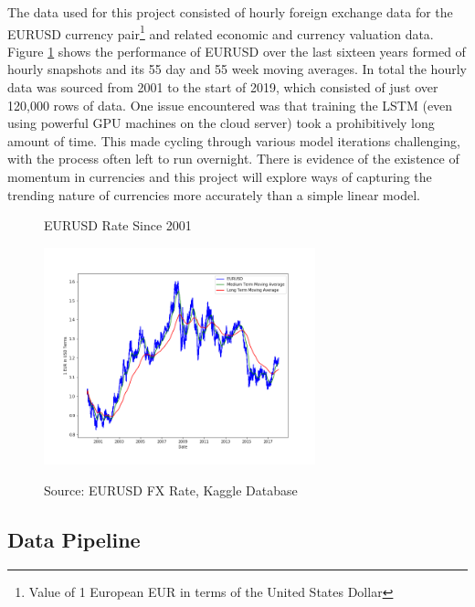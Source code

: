 \documentclass[11pt]{article}
\begin{document}
The data used for this project consisted of hourly foreign exchange data for the EURUSD currency pair\footnote{Value of 1 European EUR in terms of the United States Dollar} and related economic and currency valuation data. Figure \ref{fig:EURUSDMovingAvg} shows the performance of EURUSD over the last sixteen years formed of hourly snapshots and its 55 day and 55 week moving averages. In total the hourly data was sourced from 2001 to the start of 2019, which consisted of just over 120,000 rows of data. One issue encountered was that training the LSTM (even using powerful GPU machines on the cloud server) took a prohibitively long amount of time. This made cycling through various model iterations challenging, with the process often left to run overnight.  There is evidence of the existence of momentum in currencies \cite{Filippou2017} and this project will explore ways of capturing the trending nature of currencies more accurately than a simple linear model.
\begin{figure}[h]
    \centering
	\caption{EURUSD Rate Since 2001}
    \includegraphics[width=0.7\textwidth]{EURUSDMovingAvg}   
    \label{fig:EURUSDMovingAvg}
\caption*{\small Source: EURUSD FX Rate, Kaggle Database}
\end{figure}

\subsection{Data Pipeline}
\end{document}
